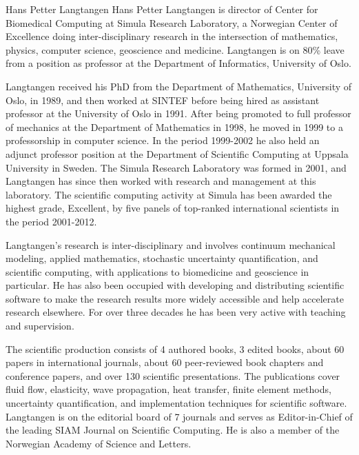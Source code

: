 \begin{participant}[PM = 8, type=leadPI, gender=male]{Hans Petter Langtangen}
Hans Petter Langtangen is director of Center for Biomedical Computing at Simula Research Laboratory, a Norwegian Center of Excellence doing inter-disciplinary research in the intersection of mathematics, physics, computer science, geoscience and medicine. Langtangen is on 80\% leave from a position as professor at the Department of Informatics, University of Oslo.

Langtangen received his PhD from the Department of Mathematics, University of Oslo, in 1989, and then worked at SINTEF before being hired as assistant professor at the University of Oslo in 1991. After being promoted to full professor of mechanics at the Department of Mathematics in 1998, he moved in 1999 to a professorship in computer science. In the period 1999-2002 he also held an adjunct professor position at the Department of Scientific Computing at Uppsala University in Sweden. The Simula Research Laboratory was formed in 2001, and Langtangen has since then worked with research and management at this laboratory. The scientific computing activity at Simula has been awarded the highest grade, Excellent, by five panels of top-ranked international scientists in the period 2001-2012.

Langtangen's research is inter-disciplinary and involves continuum mechanical modeling, applied mathematics, stochastic uncertainty quantification, and scientific computing, with applications to biomedicine and geoscience in particular. He has also been occupied with developing and distributing scientific software to make the research results more widely accessible and help accelerate research elsewhere. For over three decades he has been very active with teaching and supervision.

The scientific production consists of 4 authored books, 3 edited books, about 60 papers in international journals, about 60 peer-reviewed book chapters and conference papers, and over 130 scientific presentations. The publications cover fluid flow, elasticity, wave propagation, heat transfer, finite element methods, uncertainty quantification, and implementation techniques for scientific software. Langtangen is on the editorial board of 7 journals and serves as Editor-in-Chief of the leading SIAM Journal on Scientific Computing. He is also a member of the Norwegian Academy of Science and Letters.

\end{participant}
